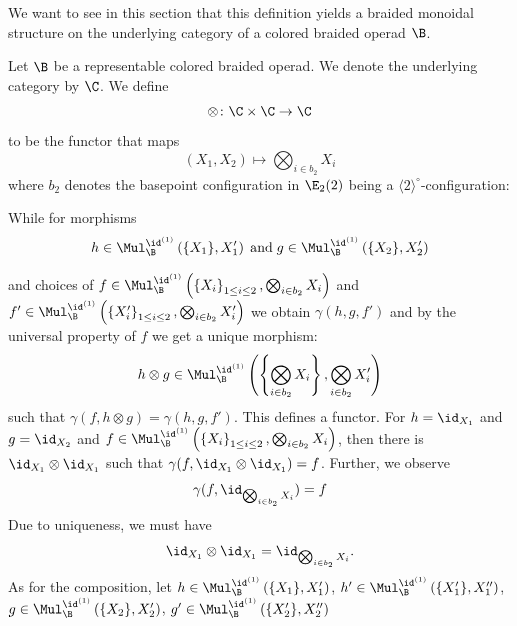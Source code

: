 We want to see in this section that this definition yields a braided monoidal
structure on the underlying category of a colored braided operad $\B$.

\begin{const}\label{con:braidmon} Let $\B$ be a representable colored braided
    operad. We denote the underlying category by $\C$. We define
    \[
        \otimes \colon \C \times \C \to \C
    \]
    to be the functor that maps
    \[
        (X_1,X_2) \mapsto \bigotimes_{i \in b_2} X_i
    \]
    where $b_2$ denotes the basepoint configuration in $\E_2(2)$ being a
    $\langle 2 \rangle^{\circ}$-configuration:
    
    \begin{center}
\end{center}
    
    
    
    While for morphisms
    \[
        h \in \Mul_{\B}^{\id^{(1)}}\left(\{X_1\}, X_1'\right) \; \text{and} \;  g \in \Mul_{\B}^{\id^{(1)}}\left(\{X_2\}, X_2'\right)
    \]

    
    and choices of $f \in \Mul_{\B}^{\id^{(1)}}\left(\left\{X_i\right\}_{1 \leq i \leq 2},
    \bigotimes_{i \in b_2} X_i\right)$
    and 
    $f' \in \Mul_{\B}^{\id^{(1)}}\left(\left\{X_i'\right\}_{1 \leq i \leq 2},
    \bigotimes_{i \in b_2} X_i'\right)$
    we obtain $\gamma(h,g,f')$ and by the universal property of $f$
    we get a unique morphism:
    \[
        h \otimes g \in \Mul_{\B}^{\id^{(1)}}\left(\left\{\bigotimes_{i \in b_2} X_i\right\}, \bigotimes_{i \in b_2} X_i'\right)
    \]
    such that $\gamma(f, h \otimes g) = \gamma(h,g,f')$.
    This defines a functor. For $h = \id_{X_1}$ and $g=\id_{X_2}$
    and $f \in \Mul_{\B}^{\id^{(1)}}\left(\left\{X_i\right\}_{1 \leq i \leq 2},
    \bigotimes_{i \in b_2} X_i\right)$, then there is $\id_{X_1} \otimes \id_{X_1}$ such that
    $\gamma(f, \id_{X_1} \otimes \id_{X_1}) = f$. Further, we observe
    \[
        \gamma(f,\id_{\bigotimes_{i \in b_2} X_i}) = f
    \]
    Due to uniqueness, we must have
    \[
        \id_{X_1} \otimes \id_{X_1} = \id_{\bigotimes_{i \in b_2} X_i}.
    \]
    As for the composition, let $h \in \Mul_{\B}^{\id^{(1)}}\left(\{X_1\}, X_1'\right)$, 
    $h' \in \Mul_{\B}^{\id^{(1)}}\left(\{X_1'\}, X_1''\right)$, 
    $g \in \Mul_{\B}^{\id^{(1)}}\left(\{X_2\}, X_2'\right)$,
    $g' \in \Mul_{\B}^{\id^{(1)}}\left(\{X_2'\}, X_2''\right)$


\end{const}
